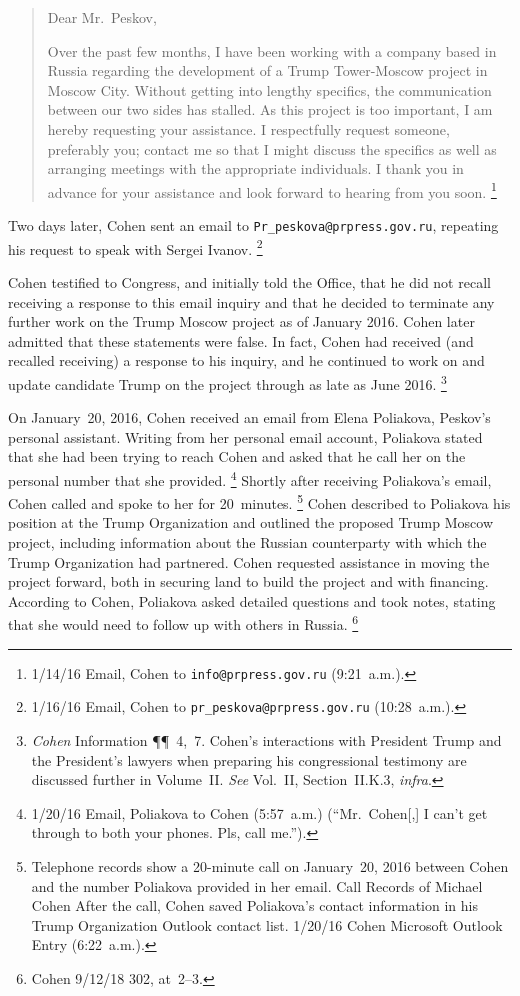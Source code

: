 \begin{quote}
Dear Mr.~Peskov,

Over the past few months, I have been working with a company based in Russia regarding the development of a Trump Tower-Moscow project in Moscow City.
Without getting into lengthy specifics, the communication between our two sides has stalled.
As this project is too important, I am hereby requesting your assistance.
I respectfully request someone, preferably you; contact me so that I might discuss the specifics as well as arranging meetings with the appropriate individuals.
I thank you in advance for your assistance and look forward to hearing from you soon.%
\footnote{1/14/16 Email, Cohen to \verb+info@prpress.gov.ru+ (9:21~a.m.).}
\end{quote}

Two days later, Cohen sent an email to \verb+Pr_peskova@prpress.gov.ru+, repeating his request to speak with Sergei Ivanov.%
\footnote{1/16/16 Email, Cohen to \verb+pr_peskova@prpress.gov.ru+ (10:28~a.m.).}

Cohen testified to Congress, and initially told the Office, that he did not recall receiving a response to this email inquiry and that he decided to terminate any further work on the Trump Moscow project as of January 2016.
Cohen later admitted that these statements were false.
In fact, Cohen had received (and recalled receiving) a response to his inquiry, and he continued to work on and update candidate Trump on the project through as late as June 2016.%
\footnote{\textit{Cohen} Information \P\P~4,~7.
Cohen's interactions with President Trump and the President's lawyers when preparing his congressional testimony are discussed further in Volume~II\null.
\textit{See} Vol.~II, Section~II.K.3, \textit{infra}.}

On January~20, 2016, Cohen received an email from Elena Poliakova, Peskov's personal assistant.
Writing from her personal email account, Poliakova stated that she had been trying to reach Cohen and asked that he call her on the personal number that she provided.%
\footnote{1/20/16 Email, Poliakova to Cohen (5:57~a.m.)
(``Mr.~Cohen[,] I can't get through to both your phones. Pls, call me.'').}
Shortly after receiving Poliakova's email, Cohen called and spoke to her for 20~minutes.%
\footnote{Telephone records show a 20-minute call on January~20, 2016 between Cohen and the number Poliakova provided in her email.
Call Records of Michael Cohen 
After the call, Cohen saved Poliakova's contact information in his Trump Organization Outlook contact list.
1/20/16 Cohen Microsoft Outlook Entry (6:22~a.m.).}
Cohen described to Poliakova his position at the Trump Organization and outlined the proposed Trump Moscow project, including information about the Russian counterparty with which the Trump Organization had partnered.
Cohen requested assistance in moving the project forward, both in securing land to build the project and with financing.
According to Cohen, Poliakova asked detailed questions and took notes, stating that she would need to follow up with others in Russia.%
\footnote{Cohen 9/12/18 302, at~2--3.}

